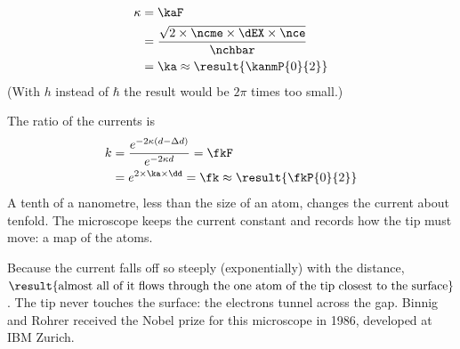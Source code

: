 \begin{abcliste}
\abc
\begin{align}
 \kappa &= \kaF \\
   &= \frac{\sqrt{2\times\ncme\times\dEX\times\nce}}{\nchbar} \\
   &= \ka \approx \result{\kanmP{0}{2}}
\end{align}
(With $h$ instead of $\hbar$ the result would be $2\pi$ times too small.)

\abc The ratio of the currents is
\begin{align}
 k &= \frac{e^{-2\kappa(d-\Delta d)}}{e^{-2\kappa d}} = \fkF \\
   &= e^{2\times\ka\times\dd} = \fk \approx \result{\fkP{0}{2}}
\end{align}
A tenth of a nanometre, less than the size of an atom, changes the current about tenfold. The microscope keeps the current constant and records how the tip must move: a map of the atoms.

\abc Because the current falls off so steeply (exponentially) with the distance, $\result{\text{almost all of it flows through the one atom of the tip closest to the surface}}$. The tip never touches the surface: the electrons tunnel across the gap. Binnig and Rohrer received the Nobel prize for this microscope in 1986, developed at IBM Zurich.
\end{abcliste}
